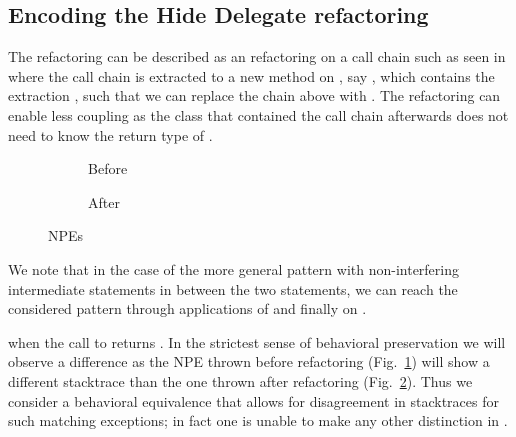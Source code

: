 \subsection{Encoding the Hide Delegate refactoring}\label{sec:hideDelegate}

The  refactoring can be described as an  refactoring on a call chain such as seen in 
where the call chain is extracted to a new method on , say , which contains the extraction , such that we can replace the chain above with .
The refactoring can enable less coupling as the class that contained the call chain afterwards does not need to know the return type of .

\begin{figure}[tbp]
  \centering
  \begin{subfigure}{.3\linewidth}
    
    \caption{Before}
    \label{fig:hd-npe-before}
  \end{subfigure}
  \begin{subfigure}{.3\linewidth}
    
    \caption{After}
    \label{fig:hd-npe-after}    
  \end{subfigure}
  \caption{NPEs}
  \label{fig:NPEs}
\end{figure}

We note that in the case of the more general pattern  with non-interfering intermediate statements in between the two statements,
we can reach the considered pattern through applications of  and finally  on .

 when the call to  returns .
In the strictest sense of behavioral preservation
we will observe a difference as the NPE thrown before refactoring (Fig.~\ref{fig:hd-npe-before}) will show a different stacktrace than the one thrown after refactoring (Fig.~\ref{fig:hd-npe-after}).
Thus we consider a behavioral equivalence that allows for disagreement in stacktraces for such matching exceptions; in fact one is unable to make any other distinction in \Refinity{}.

